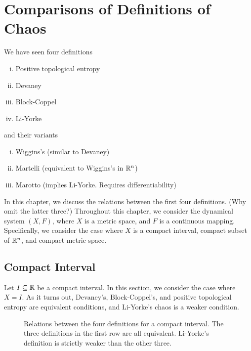 \documentclass[12pt,twoside,draft]{book}
\begin{document}
\chapter{Comparisons of Definitions of Chaos}
We have seen four definitions 
\begin{enumerate}[(i)]
  \item Positive topological entropy
  \item Devaney
  \item Block-Coppel
  \item Li-Yorke
\end{enumerate}
and their variants
\begin{enumerate}[(i)]
  \item Wiggins's (similar to Devaney)
  \item Martelli (equivalent to Wiggins's in $\mathbb{R}^n$)
  \item Marotto (implies Li-Yorke. Requires differentiability)
\end{enumerate}
In this chapter, we discuss the relations between the first four definitions.
(Why omit the latter three?)
Throughout this chapter, we consider the dynamical system $(X,F)$, where $X$ is a metric space, and $F$ is a continuous mapping.
Specifically, we consider the case where $X$ is a compact interval, compact subset of $\mathbb{R}^n$, and compact metric space.


\section{Compact Interval}
Let $I \subseteq \mathbb{R}$ be a compact interval.
In this section, we consider the case where $X = I$.
As it turns out, Devaney's, Block-Coppel's, and positive topological entropy are equivalent conditions, and Li-Yorke's chaos is a weaker condition.
\begin{figure}[ht]
  \label{fig:chaos-interval}
  \caption{
    Relations between the four definitions for a compact interval.
    The three definitions in the first row are all equivalent.
    Li-Yorke's definition is strictly weaker than the other three.
  }
\end{figure}
\end{document}
